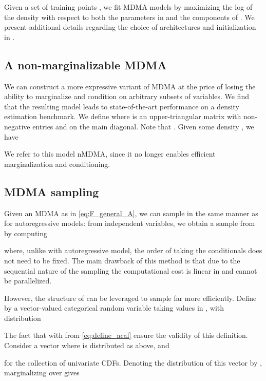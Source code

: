 \documentclass{article}
\begin{document}
Given a set of training points , we fit
MDMA models by maximizing the log of the density with respect to both the parameters in  and the components of . We present additional details regarding the choice of architectures and initialization in . 


\subsection{A non-marginalizable MDMA} \label{sec:nmdma}

We can construct a more expressive variant of MDMA at the price of losing the ability to marginalize and condition on arbitrary subsets of variables. We find that the resulting model leads to state-of-the-art performance on a density estimation benchmark.
We define  where  is an upper-triangular matrix with non-negative entries and  on the main diagonal. Note that .
Given some density , we have 

We refer to this model nMDMA, since it no longer enables efficient marginalization and conditioning. 











\subsection{MDMA sampling}

Given an MDMA as in \cref{eq:F_general_A}, we can sample in the same manner as for autoregressive models:
from  independent  variables, we obtain a sample from  by computing 

where, unlike with autoregressive model, the order of taking the conditionals does not need to be fixed.
The main drawback of this method is that due to the sequential nature of the sampling the computational cost is linear in  and cannot be parallelized.

However, the structure of  can be leveraged to sample far more efficiently.
Define by  a vector-valued categorical random variable taking values in , with distribution 

The fact that  with  from \eqref{eq:define_acal} ensure the validity of this definition.
Consider a vector  where  is distributed as above, and 

for the collection  of univariate CDFs.
Denoting the distribution of this vector by , marginalizing over  gives 
\end{document}
